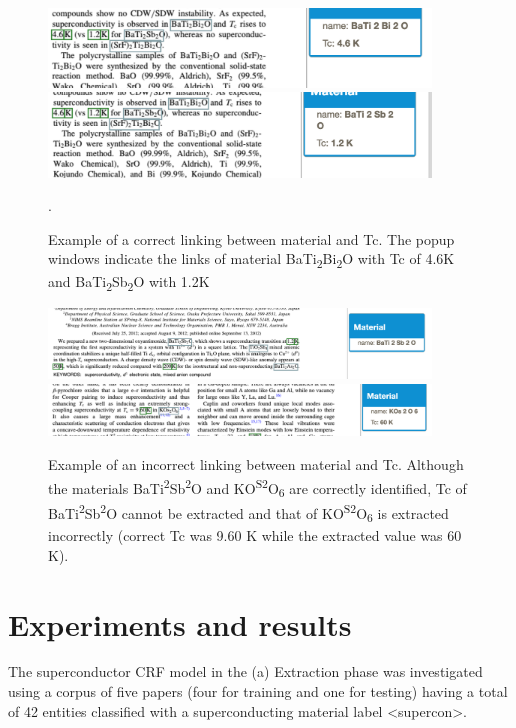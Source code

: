 \documentclass{article}[a4]
\begin{document}
\begin{figure}[h]
    \centering
    \includegraphics[width=4in]{example1} 
    \includegraphics[width=4in]{example2}
    \caption{Example of a correct linking between material and Tc. The popup windows indicate the links of material BaTi\textsubscript{2}Bi\textsubscript{2}O with Tc of 4.6K and BaTi\textsubscript{2}Sb\textsubscript{2}O with 1.2K}.
    \label{fig:example-working}
\end{figure}

\begin{figure}[h]
    \centering
    \includegraphics[width=4in]{example-bad1} 
    \includegraphics[width=4in]{example-bad2}
    \caption{Example of an incorrect linking between material and Tc. Although the materials BaTi\textsuperscript{2}Sb\textsuperscript{2}O and KO\textsuperscript{S2}O\textsubscript{6} are correctly identified, Tc of BaTi\textsuperscript{2}Sb\textsuperscript{2}O cannot be extracted and that of KO\textsuperscript{S2}O\textsubscript{6} is extracted incorrectly (correct Tc was 9.60 K while the extracted value was 60 K). }
    \label{fig:example-not-working}
\end{figure}

\section{Experiments and results}
\label{sec:experiments-results}
The superconductor CRF model in the (a) Extraction phase was investigated using a corpus of five papers (four for training and one for testing) having a total of 42 entities classified with a superconducting material label \textless supercon\textgreater.
\end{document}
